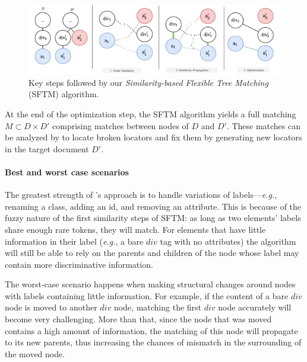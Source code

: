 \begin{figure}[!t]
    \centering
    \includegraphics[width=\linewidth]{erratum/explanations/sftm}
    \caption{Key steps followed by our \emph{Similarity-based Flexible Tree Matching} (SFTM) algorithm.}
    \label{fig:steps_sftm}
\end{figure}

At the end of the optimization step, the SFTM algorithm yields a full matching $M \subset D \times D' $ comprising matches between nodes of $D$ and $D'$.
These matches can be analyzed by \erratum{} to locate broken locators and fix them by generating new locators in the target document $D'$.

\paragraph{Best and worst case scenarios}
The greatest strength of \erratum's approach is to handle variations of labels---\emph{e.g.}, renaming a class, adding an id, and removing an attribute.
This is because of the fuzzy nature of the first similarity steps of SFTM: as
long as two elements' labels share enough rare tokens, they will match.
For elements that have little information in their label (\emph{e.g.}, a bare $div$ tag with no attributes) the algorithm will still be able to rely on the parents and children of the node whose label may contain more discriminative information.

The worst-case scenario happens when making structural changes around nodes with labels containing little information.
For example, if the content of a bare $div$ node is moved to another $div$ node,
matching the first $div$ node accurately will become very challenging.
More than that, since the node that was moved contains a high amount of information, the matching of this node will propagate to its new parents, thus increasing the chances of mismatch in the surrounding of the moved node.


